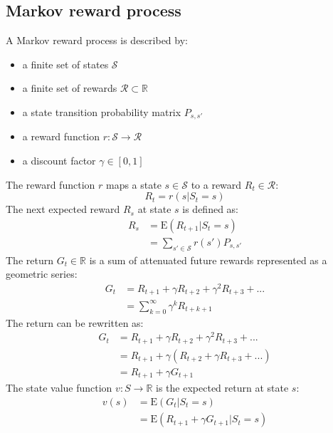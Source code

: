 \documentclass{article}
\begin{document}
\subsection{Markov reward process}
A Markov reward process is described by:
\begin{itemize}
    \item a finite set of states $ \mathcal{S} $
    \item a finite set of rewards $ \mathcal{R} \subset \mathbb{R} $
    \item a state transition probability matrix $ P_{s,s'} $
    \item a reward function $r: \mathcal{S} \to \mathcal{R} $
    \item a discount factor $ \gamma \in [0, 1] $
\end{itemize}    
The reward function $ r $ maps a state $  s \in \mathcal{S} $ to a reward $ R_t \in \mathcal{R} $:
\[ R_t = r(s | S_t = s) \]
The next expected reward $ R_s $ at state $ s $ is defined as:
\begin{equation*}
\begin{split}
R_s & =\text{E}(R_{t+1} | S_t = s) \\
 & = \sum_{s' \in \mathcal{S}} r(s') P_{s,s'}
\end{split}
\end{equation*}
The return $ G_t \in \mathbb{R} $ is a sum of attenuated future rewards represented as a geometric series:
\begin{equation*}
\begin{split}
G_t & = R_{t+1} + \gamma R_{t+2} + \gamma^{2} R_{t+3} + ... \\
 & = \sum_{k = 0}^{\infty} \gamma^{k} R_{t+k+1}
\end{split}
\end{equation*}
The return can be rewritten as:
\begin{equation*}
\begin{split}
G_t & = R_{t+1} + \gamma R_{t+2} + \gamma^{2} R_{t+3} + ... \\
 & = R_{t+1} + \gamma ( R_{t+2} + \gamma R_{t+3} + ...) \\
 & = R_{t+1} + \gamma G_{t+1}
\end{split}
\end{equation*}
The state value function $ v: S \to \mathbb{R} $ is the expected return at state $ s $:
\begin{equation*}
\begin{split}
v(s) & = \text{E}(G_t | S_t = s) \\
 & = \text{E}(R_{t+1} + \gamma G_{t+1} | S_t = s)
\end{split}
\end{equation*}
\end{document}
